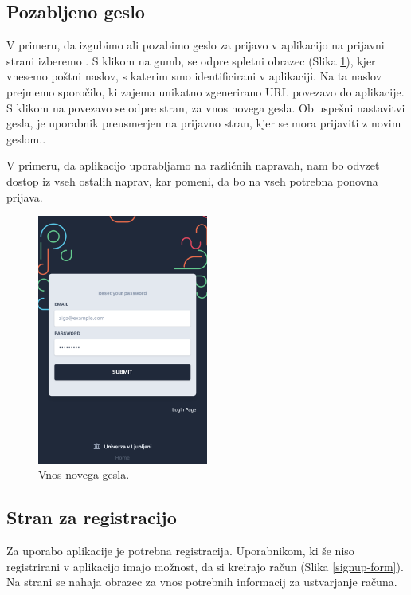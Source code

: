 \documentclass[a4paper, 12pt]{book}
\begin{document}
\subsection{Pozabljeno geslo}
\label{forgotten-form}
V primeru, da izgubimo ali pozabimo geslo za prijavo v aplikacijo na prijavni strani izberemo . S klikom na gumb, se odpre spletni obrazec (Slika \ref{password-reset-form}), kjer vnesemo poštni naslov, s katerim smo identificirani v aplikaciji. Na ta naslov prejmemo sporočilo, ki zajema unikatno zgenerirano URL povezavo do aplikacije. S klikom na povezavo se odpre stran, za vnos novega gesla. Ob uspešni nastavitvi gesla, je uporabnik preusmerjen na prijavno stran, kjer se mora prijaviti z novim geslom.. 

V primeru, da aplikacijo uporabljamo na različnih napravah, nam bo odvzet dostop iz vseh ostalih naprav, kar pomeni, da bo na vseh potrebna ponovna prijava.

\begin{figure}[h]
\begin{center}
\includegraphics[width=0.5\textwidth]{slike/reset_password.png}
\end{center}
\caption{ Vnos novega gesla. }
\label{password-reset-form}
\end{figure}

\subsection{Stran za registracijo }
\label{registration-page}
Za uporabo aplikacije je potrebna registracija. Uporabnikom, ki še niso registrirani v aplikacijo imajo možnost, da si kreirajo račun (Slika \ref{signup-form}). Na strani se nahaja obrazec za vnos potrebnih informacij za ustvarjanje računa.
\end{document}
